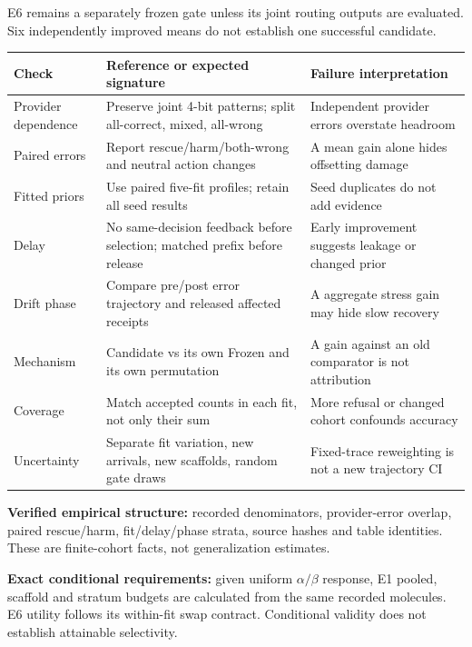 \documentclass[10pt,letterpaper]{article}
\newcommand{\sect}[1]{\vspace{5pt}{\large\bfseries #1}\par\vspace{2pt}}
\newenvironment{clean}{\begin{center}\fontsize{9.5}{11.5}\selectfont\setlength{\tabcolsep}{6pt}\renewcommand{\arraystretch}{1.06}}{\end{center}}
\begin{document}
E6 remains a separately frozen gate unless its joint routing outputs are evaluated. Six independently improved means do not establish one successful candidate.
\newpage
\sect{Distribution checks for the scientist}
\begin{clean}\begin{tabular}{@{}p{.20\linewidth}p{.39\linewidth}p{.32\linewidth}@{}}
\toprule
Check & Reference or expected signature & Failure interpretation \\
\midrule
Provider dependence & Preserve joint 4-bit patterns; split all-correct, mixed, all-wrong & Independent provider errors overstate headroom \\
Paired errors & Report rescue/harm/both-wrong and neutral action changes & A mean gain alone hides offsetting damage \\
Fitted priors & Use paired five-fit profiles; retain all seed results & Seed duplicates do not add evidence \\
Delay & No same-decision feedback before selection; matched prefix before release & Early improvement suggests leakage or changed prior \\
Drift phase & Compare pre/post error trajectory and released affected receipts & A aggregate stress gain may hide slow recovery \\
Mechanism & Candidate vs its own Frozen and its own permutation & A gain against an old comparator is not attribution \\
Coverage & Match accepted counts in each fit, not only their sum & More refusal or changed cohort confounds accuracy \\
Uncertainty & Separate fit variation, new arrivals, new scaffolds, random gate draws & Fixed-trace reweighting is not a new trajectory CI \\
\bottomrule
\end{tabular}\end{clean}
\sect{What has high-confidence support, and what still needs evidence}
\textbf{Verified empirical structure:} recorded denominators, provider-error overlap, paired rescue/harm,
fit/delay/phase strata, source hashes and table identities. These are finite-cohort facts, not generalization estimates.

\textbf{Exact conditional requirements:} given uniform $\alpha/\beta$ response, E1 pooled,
scaffold and stratum budgets are calculated from the same recorded molecules. E6 utility follows its
within-fit swap contract. Conditional validity does not establish attainable selectivity.
\end{document}
